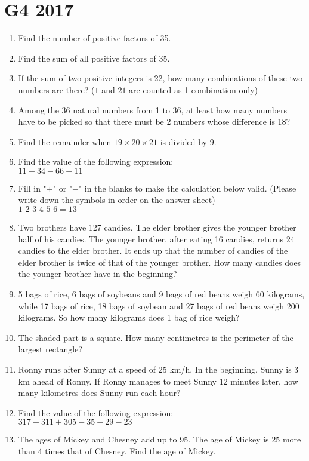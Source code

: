\documentclass[11pt]{scrartcl}
\begin{document}
\section{G4 2017}
\begin{enumerate}
    \item Find the number of positive factors of 35.
    \item Find the sum of all positive factors of 35.
    \item If the sum of two positive integers is 22, how many combinations of these two numbers are there? ($1$ and $21$ are counted as 1 combination only)
    \item Among the 36 natural numbers from 1 to 36, at least how many numbers have to be picked so that there must be 2 numbers whose difference is 18?
    \item Find the remainder when $19 \times 20 \times 21$ is divided by 9.
    \item Find the value of the following expression: \\
        $11 + 34 - 66 + 11$
    \item Fill in "$+$" or "$-$" in the blanks to make the calculation below valid. (Please write down the symbols in order on the answer sheet) \\
        $1\_ 2 \_ 3\_ 4 \_ 5 \_ 6 = 13$
    \item Two brothers have 127 candies. The elder brother gives the younger brother half of his candies. The younger brother, after eating 16 candies, returns 24 candies to the elder brother. It ends up that the number of candies of the elder brother is twice of that of the younger brother. How many candies does the younger brother have in the beginning?
    \item 5 bags of rice, 6 bags of soybeans and 9 bags of red beans weigh 60 kilograms, while 17 bags of rice, 18 bags of soybean and 27 bags of red beans weigh 200 kilograms. So how many kilograms does 1 bag of rice weigh?
    \item The shaded part is a square. How many centimetres is the perimeter of the largest rectangle?
    \item Ronny runs after Sunny at a speed of 25 km/h. In the beginning, Sunny is 3 km ahead of Ronny. If Ronny manages to meet Sunny 12 minutes later, how many kilometres does Sunny run each hour?
    \item Find the value of the following expression: \\
        $317 - 311 + 305 - 35 + 29 - 23$
    \item The ages of Mickey and Chesney add up to 95. The age of Mickey is 25 more than 4 times that of Chesney. Find the age of Mickey.

\end{enumerate}
\end{document}
